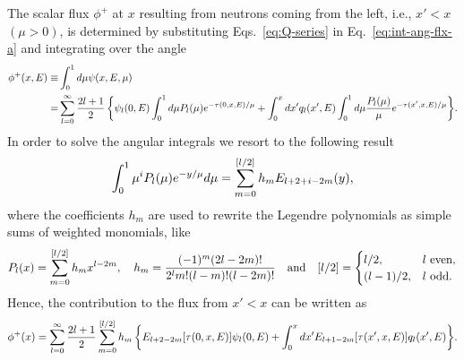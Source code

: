%
The scalar flux $\phi^+$ at $x$ resulting from neutrons coming from the left, i.e., $x'<x$ $(\mu>0)$, is determined by substituting Eqs.~\eqref{eq:Q-series} in Eq.~\eqref{eq:int-ang-flx-a} and integrating over the angle 
\begin{equation}\label{eq:phi+}
\begin{split}
\phi^+(x,E) \equiv& \int_0^1 {d\mu \psi(x,E,\mu)} \\
=& \sum\limits_{l=0}^\infty {
	\frac{2l+1}{2} 
		\left\{\psi_l(0,E) \int_0^1 { d\mu
		\ensuremath{P_l(\mu)} e^{-\tau(0,x,E)/\mu}	
	}
	+	\int_0^x { dx'
		q_l(x',E)
		\int_0^1 { d\mu
			\frac{\ensuremath{P_l(\mu)}}{\mu} e^{-\tau(x',x,E)/\mu}	
		}
	}
\right\}
}.
\end{split}
\end{equation}
In order to solve the angular integrals we resort to the following result~\cite{Cengel-1984,Settle-1994}
\begin{equation}\label{eq:Sni}
\int_0^1 { 
	\mu^i P_l(\mu) e^{-y/\mu} d\mu
} = \sum\limits_{m=0}^{[l/2]} {
	h_m E_{l+2+i-2m}(y)
},
\end{equation}
where the coefficients $h_m$ are used to rewrite the Legendre polynomials as simple sums of weighted monomials, like
\begin{equation}\label{eq:h_i}
P_l(x)=\sum\limits_{m=0}^{[l/2]} {
	h_m x^{l-2m}
}, \quad
h_m = \frac{(-1)^m (2l-2m)!}{2^l m! (l-m)! (l-2m)!}
\quad \text{and} \quad
[l/2] = 
\begin{cases}
l/2, & l \text{ even}, \\
(l - 1)/2, & l \text{ odd}.
\end{cases}
\end{equation}
%
Hence, the contribution to the flux from $x'<x$ can be written as
\begin{equation}\label{eq:phi+2}
\phi^+(x)= \sum\limits_{l=0}^\infty {
	\frac{2l+1}{2} \sum\limits_{m=0}^{[l/2]} { h_m
		\left\{                
		        E_{l+2-2m}[\tau(0,x,E)]                         
		        \psi_l(0,E) 
		       +       \int_0^x { dx'
		        E_{l+1-2m}[\tau(x',x,E)]
		        q_l(x',E)                               
		} 
	\right\}
	}
}.
\end{equation}
